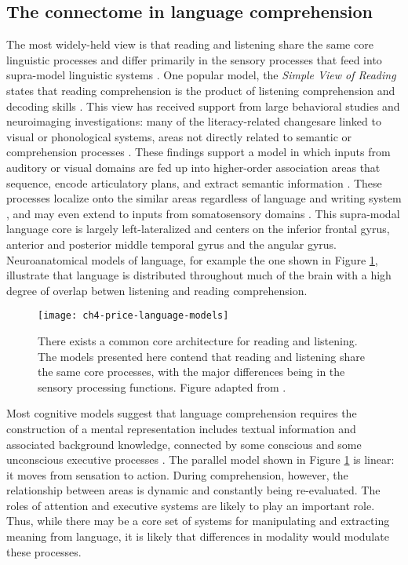 \subsection{The connectome in language comprehension}

The most widely-held view is that reading and listening share the same core linguistic processes and differ primarily in the sensory processes that feed into supra-model linguistic systems \citep{Mattingly1971, Price2012}. One popular model, the \textit{Simple View of Reading} states that reading comprehension is the product of listening comprehension and decoding skills \citep{Gough1986}. This view has received support from large behavioral studies \citep{Kirby2008} and neuroimaging investigations: many of the literacy-related changesare linked to visual or phonological systems, areas not directly related to semantic or comprehension processes \citep{Schlaggar2007, Dehaene2015}. These findings support a model in which inputs from auditory or visual domains are fed up into higher-order association areas that sequence, encode articulatory plans, and extract semantic information \citep{Price2012}. These processes localize onto the similar areas regardless of language and writing system \citep{Rueckl2015}, and may even extend to inputs from somatosensory domains \citep{Xu2005, Sood2016}. This supra-modal language core is largely left-lateralized and centers on the inferior frontal gyrus, anterior and posterior middle temporal gyrus and the angular gyrus. Neuroanatomical models of language, for example the one shown in Figure \ref{fig:ch4-price-language-models}, illustrate that language is distributed throughout much of the brain with a high degree of overlap betwen listening and reading comprehension. 

\begin{figure}[t]
	\centering
	\texttt{[image: ch4-price-language-models]}
    \caption[Common core architecture for reading and listening]{There exists a common core architecture for reading and listening. The models presented here contend that reading and listening share the same core processes, with the major differences being in the sensory processing functions. Figure adapted from \citep{Price2012}.}
	\label{fig:ch4-price-language-models}
\end{figure}

Most cognitive models suggest that language comprehension requires the construction of a mental representation includes textual information and associated background knowledge, connected by some conscious and some unconscious executive processes \citep{Kendeou2014}. The parallel model shown in Figure \ref{fig:ch4-price-language-models} is linear: it moves from sensation to action. During comprehension, however, the relationship between areas is dynamic and constantly being re-evaluated. The roles of attention and executive systems are likely to play an important role. Thus, while there may be a core set of systems for manipulating and extracting meaning from language, it is likely that differences in modality would modulate these processes. 


